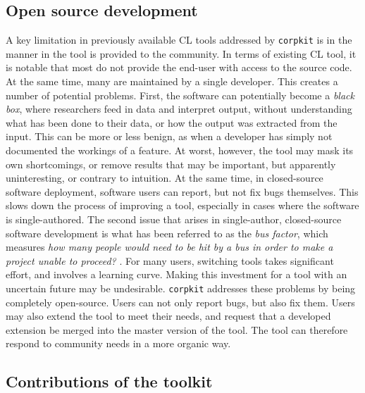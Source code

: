 \subsection{Open source development}

A key limitation in previously available \gls{CL} tools addressed by \texttt{corpkit} is in the manner in the tool is provided to the community. In terms of existing \gls{CL} tool, it is notable that most do not provide the end\hyp{}user with access to the source code. At the same time, many are maintained by a single developer. This creates a number of potential problems. First, the software can potentially become a \emph{black box}, where researchers feed in data and interpret output, without understanding what has been done to their data, or how the output was extracted from the input. This can be more or less benign, as when a developer has simply not documented the workings of a feature. At worst, however, the tool may mask its own shortcomings, or remove results that may be important, but apparently uninteresting, or contrary to intuition. At the same time, in closed\hyp{}source software deployment, software users can report, but not fix bugs themselves. This slows down the process of improving a tool, especially in cases where the software is single\hyp{}authored. The second issue that arises in single\hyp{}author, closed\hyp{}source software development is what has been referred to as the \emph{bus factor}, which measures \emph{how many people would need to be hit by a bus in order to make a project unable to proceed?} \cite{cosentino2015assessing}. For many users, switching tools takes significant effort, and involves a learning curve. Making this investment for a tool with an uncertain future may be undesirable. \texttt{corpkit} addresses these problems by being completely open\hyp{}source. Users can not only report bugs, but also fix them. Users may also extend the tool to meet their needs, and request that a developed extension be merged into the master version of the tool. The tool can therefore respond to community needs in a more organic way.

\subsection{Contributions of the toolkit}

